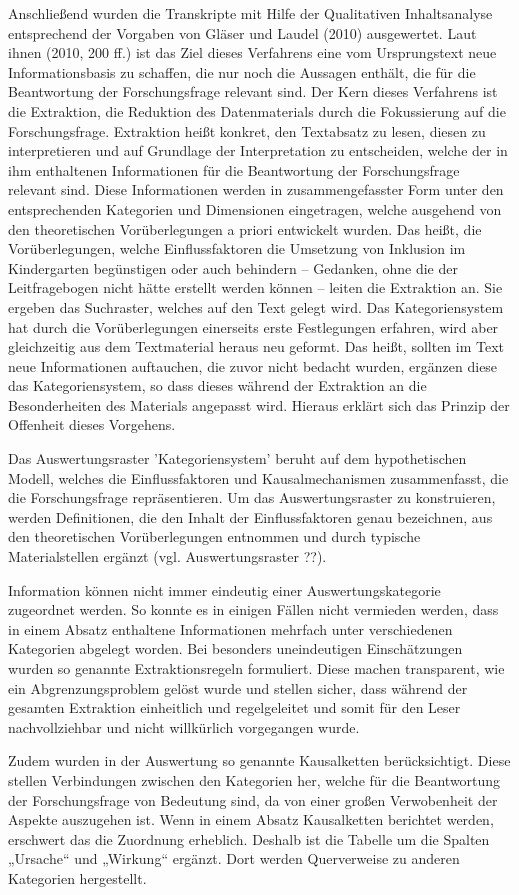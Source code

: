 Anschließend wurden die Transkripte mit Hilfe der Qualitativen Inhaltsanalyse entsprechend der Vorgaben von Gläser und Laudel (2010) ausgewertet. Laut ihnen (2010, 200 ff.) ist das Ziel dieses Verfahrens eine vom Ursprungstext neue Informationsbasis zu schaffen, die nur noch die Aussagen enthält, die für die Beantwortung der Forschungsfrage relevant sind. Der Kern dieses Verfahrens ist die Extraktion, die Reduktion des Datenmaterials durch die Fokussierung auf die Forschungsfrage. Extraktion heißt konkret, den Textabsatz zu lesen, diesen zu interpretieren und auf Grundlage der Interpretation zu entscheiden, welche der in ihm enthaltenen Informationen für die Beantwortung der Forschungsfrage relevant sind. Diese Informationen werden in zusammengefasster Form unter den entsprechenden Kategorien und Dimensionen eingetragen, welche ausgehend von den theoretischen Vorüberlegungen a priori entwickelt wurden. Das heißt, die Vorüberlegungen, welche Einflussfaktoren die Umsetzung von Inklusion im Kindergarten begünstigen oder auch behindern -- Gedanken, ohne die der Leitfragebogen nicht hätte erstellt werden können -- leiten die Extraktion an. Sie ergeben das Suchraster, welches auf den Text gelegt wird. Das Kategoriensystem hat durch die Vorüberlegungen einerseits erste Festlegungen erfahren, wird aber gleichzeitig aus dem Textmaterial heraus neu geformt. Das heißt, sollten im Text neue Informationen auftauchen, die zuvor nicht bedacht wurden, ergänzen diese das Kategoriensystem, so dass dieses während der Extraktion an die Besonderheiten des Materials angepasst wird. Hieraus erklärt sich das Prinzip der Offenheit dieses Vorgehens. 

Das Auswertungsraster ’Kategoriensystem’ beruht auf dem hypothetischen Modell, welches die Einflussfaktoren und Kausalmechanismen zusammenfasst, die die Forschungsfrage repräsentieren. Um das Auswertungsraster zu konstruieren, werden Definitionen, die den Inhalt der Einflussfaktoren genau bezeichnen, aus den theoretischen Vorüberlegungen entnommen und durch typische Materialstellen ergänzt (vgl. Auswertungsraster ??). 

Information können nicht immer eindeutig einer Auswertungskategorie zugeordnet werden. So konnte es in einigen Fällen nicht vermieden werden, dass in einem Absatz enthaltene Informationen mehrfach unter verschiedenen Kategorien abgelegt worden. Bei besonders uneindeutigen Einschätzungen wurden so genannte Extraktionsregeln formuliert. Diese machen transparent, wie ein Abgrenzungsproblem gelöst wurde und stellen sicher, dass während der gesamten Extraktion einheitlich und regelgeleitet und somit für den Leser nachvollziehbar und nicht willkürlich vorgegangen wurde. 

Zudem wurden in der Auswertung so genannte Kausalketten berücksichtigt. Diese stellen Verbindungen zwischen den Kategorien her, welche für die Beantwortung der Forschungsfrage von Bedeutung sind, da von einer großen Verwobenheit der Aspekte auszugehen ist. Wenn in einem Absatz Kausalketten berichtet werden, erschwert das die Zuordnung erheblich. Deshalb ist die Tabelle um die Spalten „Ursache“ und „Wirkung“ ergänzt. Dort werden Querverweise zu anderen Kategorien hergestellt.


     
 
